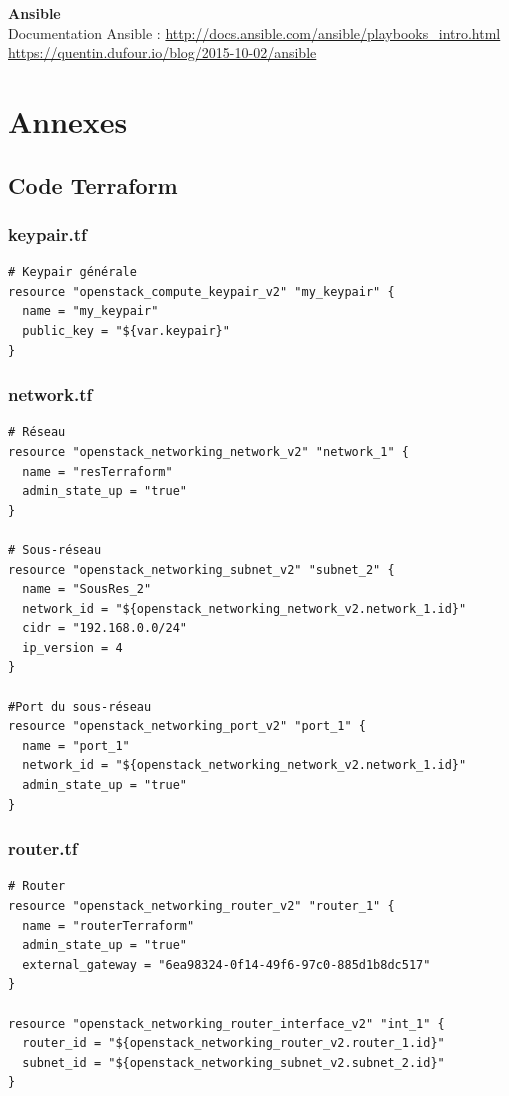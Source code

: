 \documentclass[]{article}
\begin{document}
\textbf{Ansible}\\
Documentation Ansible : \url{http://docs.ansible.com/ansible/playbooks_intro.html}\\
\url{https://quentin.dufour.io/blog/2015-10-02/ansible}

\newpage
\section*{Annexes}
\subsection*{Code Terraform}
\subsubsection*{keypair.tf}
\begin{verbatim}
# Keypair générale
resource "openstack_compute_keypair_v2" "my_keypair" {
  name = "my_keypair"
  public_key = "${var.keypair}"
}
\end{verbatim}

\subsubsection*{network.tf}
\begin{verbatim}
# Réseau
resource "openstack_networking_network_v2" "network_1" {
  name = "resTerraform"
  admin_state_up = "true"
}

# Sous-réseau
resource "openstack_networking_subnet_v2" "subnet_2" {
  name = "SousRes_2"
  network_id = "${openstack_networking_network_v2.network_1.id}"
  cidr = "192.168.0.0/24"
  ip_version = 4 
}

#Port du sous-réseau
resource "openstack_networking_port_v2" "port_1" {
  name = "port_1"
  network_id = "${openstack_networking_network_v2.network_1.id}"
  admin_state_up = "true"
}
\end{verbatim}

\subsubsection*{router.tf}
\begin{verbatim}
# Router
resource "openstack_networking_router_v2" "router_1" {
  name = "routerTerraform"
  admin_state_up = "true"
  external_gateway = "6ea98324-0f14-49f6-97c0-885d1b8dc517"
}

resource "openstack_networking_router_interface_v2" "int_1" {
  router_id = "${openstack_networking_router_v2.router_1.id}"
  subnet_id = "${openstack_networking_subnet_v2.subnet_2.id}"
}
\end{verbatim}
\end{document}
